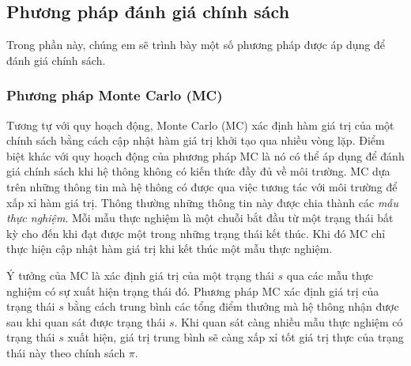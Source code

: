 \subsection{Phương pháp đánh giá chính sách}
Trong phần này, chúng em sẽ trình bày một số phương pháp được áp dụng để đánh giá chính sách.


\subsubsection{Phương pháp Monte Carlo (MC)}
Tương tự với quy hoạch động, Monte Carlo (MC) xác định hàm giá trị của một chính sách bằng cách cập nhật hàm giá trị khởi tạo qua nhiều vòng lặp. Điểm biệt khác với quy hoạch động của phương pháp MC là nó có thể áp dụng để đánh giá chính sách khi hệ thông không có kiến thức đầy đủ về môi trường. MC dựa trên những thông tin mà hệ thông có được qua việc tương tác với môi trường để xấp xỉ hàm giá trị. Thông thường những thông tin này được chia thành các \textit{mẫu thực nghiệm}. Mỗi mẫu thực nghiệm là một chuỗi bắt đầu từ một trạng thái bất kỳ cho đến khi đạt được một trong những trạng thái kết thúc. Khi đó MC chỉ thực hiện cập nhật hàm giá trị khi kết thúc một mẫu thực nghiệm.

Ý tưởng của MC là xác định giá trị của một trạng thái $s$ qua các mẫu thực nghiệm có sự xuất hiện trạng thái đó. Phương pháp MC xác định giá trị của trạng thái $s$ bằng cách trung bình các tổng điểm thưởng mà hệ thông nhận được sau khi quan sát được trạng thái $s$. Khi quan sát càng nhiều mẫu thực nghiệm có trạng thái $s$ xuất hiện, giá trị trung bình sẽ càng xấp xỉ tốt giá trị thực của trạng thái này theo chính sách $\pi$.

